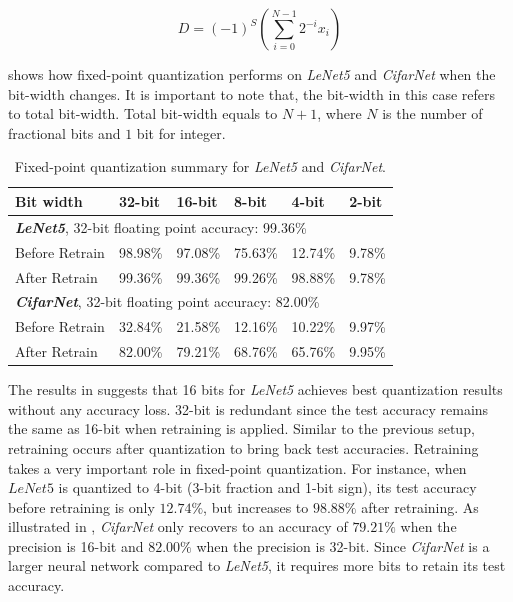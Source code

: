 \documentclass[a4paper,12pt]{report}
\begin{document}
\begin{equation}
    D = (-1)^S (\sum^{N-1}_{i=0}2^{-i}x_i)
    \label{equ:d2fp}
\end{equation}

 shows how fixed-point quantization performs on \textit{LeNet5}
and \textit{CifarNet} when the bit-width changes.
It is important to note that, the bit-width in this case refers to total bit-width.
Total bit-width equals to $N+1$, where
$N$ is the number of fractional bits and $1$ bit for integer.

\begin{table}[!h]
  \centering
  \begin{tabular}{llllll}
    \hline
    \hline
    Bit width               &32-bit     &16-bit     &8-bit    &4-bit    &2-bit  \\
    \hline
    \multicolumn{5}{l}{\textbf{\textit{LeNet5}}, 32-bit floating point accuracy: 99.36\%}\\
    \hline
    \hline
    Before Retrain          &98.98\%    &97.08\%    &75.63\%    &12.74\%  &9.78\%\\
    After Retrain           &99.36\%    &99.36\%    &99.26\%    &98.88\%  &9.78\%\\
    \hline
    \hline
    \multicolumn{5}{l}{\textbf{\textit{CifarNet}}, 32-bit floating point accuracy: 82.00\%}\\
    \hline
    Before Retrain          &32.84\%        &21.58\%    &12.16\%  &10.22\%  &9.97\%\\
    After Retrain           &82.00\%        &79.21\%    &68.76\%  &65.76\%  &9.95\%\\
    \hline
    \hline
  \end{tabular}
  \caption{Fixed-point quantization summary for \textit{LeNet5} and \textit{CifarNet}.}
  \label{tab:fp_sum}
\end{table}

The results in  suggests that 16 bits for \textit{LeNet5}
achieves best quantization results without any accuracy loss.
32-bit is redundant since the test accuracy remains the same as 16-bit when
retraining is applied.
Similar to the previous setup, retraining occurs after quantization to bring
back test accuracies.
Retraining takes a very important role in fixed-point quantization.
For instance, when $LeNet5$ is quantized to 4-bit (3-bit fraction and 1-bit sign),
its test accuracy before retraining is only $12.74\%$, but increases to $98.88\%$ after retraining.
As illustrated in , \textit{CifarNet} only recovers to an accuracy
of $79.21\%$ when the precision is 16-bit and $82.00\%$ when the precision is
32-bit.
Since \textit{CifarNet} is a larger neural network compared to \textit{LeNet5},
it requires more bits to retain its test accuracy.
\end{document}
